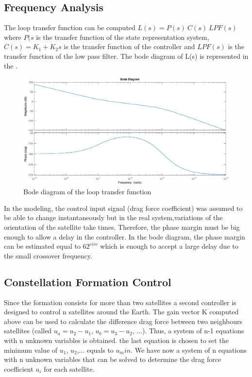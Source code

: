 \subsection{Frequency Analysis}
The loop transfer function can be computed $L(s) = P(s) \ C(s) \ LPF(s)$ where $P(s$ is the transfer function of the state representation system, $C(s) = K_1 + K_2 s$ is the transfer function of the controller and $LPF(s)$ is the transfer function of the low pass filter.
The bode diagram of L(s) is represented in the . \\
\begin{figure}[H]
	\centering
	\includegraphics[width=0.9\linewidth]
	{figures/Bode_L.eps}
	\caption{Bode diagram of the loop transfer function}
	\label{fig:Bode_L}
\end{figure}
In the modeling, the control input signal (drag force coefficient) was assumed to be able to change instantaneously but in the real system,variations of the orientation of the satellite take times. Therefore, the phase margin must be big enough to allow a delay in the controller. In the bode diagram, the phase margin can be estimated equal to $62^{circ}$ which is enough to accept a large delay due to the small crossover frequency. \\

\subsection{Constellation Formation Control} 
Since the formation consists for more than two satellites a second controller is designed to control n satellites around the Earth. The gain vector K computed above can be used to calculate the difference drag force between two neighbours satellites (called $u_a = u_2 - u_1$, $u_b = u_3 - u_2$, ...). Thus, a system of n-1 equations with n unknown variables is obtained. the last equation is chosen to set the minimum value of $u_1$, $u_2$,... equals to $u_min$. We have now a system of n equations with n unknown variables that can be solved to determine the drag force coefficient $u_i$ for each satellite.
